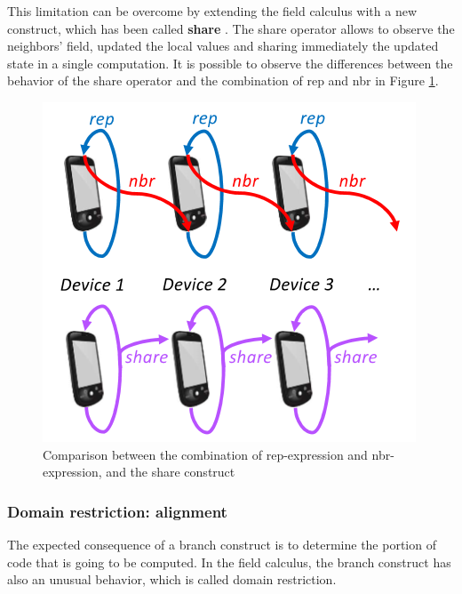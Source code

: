 This limitation can be overcome by extending the field calculus with a new construct, which has been called \textbf{share} \cite{share_operator}. The share operator allows to observe the neighbors' field, updated the local values and sharing immediately the updated state in a single computation. It is possible to observe the differences between the behavior of the share operator and the combination of rep and nbr in Figure \ref{fig:share_operator_introduction}.

\begin{figure}[!ht]
    \centering
    \includegraphics[scale=0.8]{document/chapters/1-introduction/images/share_operator_introduction.png}
    \caption{Comparison between the combination of rep-expression and nbr-expression, and the share construct \cite{share_operator}}
    \label{fig:share_operator_introduction}
\end{figure}

\subsubsection{Domain restriction: alignment}\label{subsection:alignment}
The expected consequence of a branch construct is to determine the portion of code that is going to be computed. In the field calculus, the branch construct has also an unusual behavior, which is called domain restriction.

